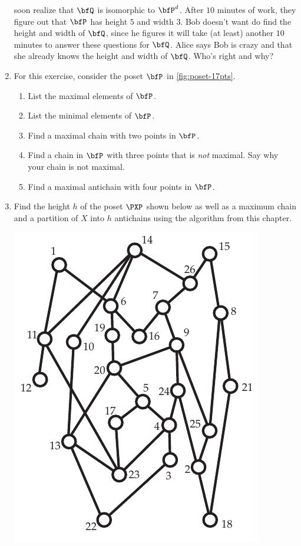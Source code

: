\begin{enumerate}
  soon realize that $\bfQ$ is isomorphic to $\bfP^d$. After $10$
  minutes of work, they figure out that $\bfP$ has height $5$ and
  width $3$. Bob doesn't want do find the height and width of $\bfQ$,
  since he figures it will take (at least) another $10$ minutes to
  answer these questions for $\bfQ$. Alice says Bob is crazy and that
  she already knows the height and width of $\bfQ$. Who's right and
  why?  
\item For this exercise, consider the poset $\bfP$ in \autoref{fig:poset-17pts}.
  \begin{enumerate}
  \item List the maximal elements of $\bfP$.
  \item List the minimal elements of $\bfP$.
  \item Find a maximal chain with two points in $\bfP$.
  \item Find a chain in $\bfP$ with three points that is \emph{not}
    maximal. Say why your chain is not maximal.
  \item Find a maximal antichain with four points in $\bfP$.
  \end{enumerate}
\item Find the height $h$ of the poset $\PXP$ shown below as well as a
  maximum chain and a partition of $X$ into $h$ antichains using the
  algorithm from this chapter.
  \begin{center}
    \includegraphics{posets-figs/height_ex_poset}

\end{center}
\end{enumerate}

